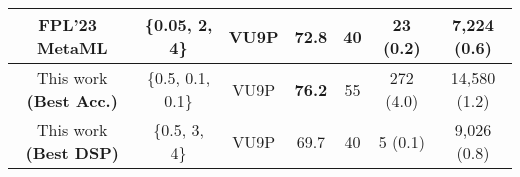 \begin{table}[t]
{\begin{threeparttable}
\begin{tabular}{c| c | c |c |c | c |c }
FPL'23~\cite{que2023metaml} MetaML

& \{0.05, 2, 4\} & VU9P & 72.8 & 40 
& 23 (0.2)
& 7,224 (0.6)
 \\

\midrule
\midrule
This work \textbf{(Best Acc.)}
& \{0.5, 0.1, 0.1\} & VU9P & \textbf{76.2} & 55 
& 272 (4.0)
& 14,580 (1.2)
 \\

\midrule
This work \textbf{(Best DSP)} 
& \{0.5, 3, 4\} & VU9P & 69.7 & 40 
& 5 (0.1)
& 9,026 (0.8)
 \\
 
\midrule


\end{tabular}
\end{threeparttable}}
\end{table}
